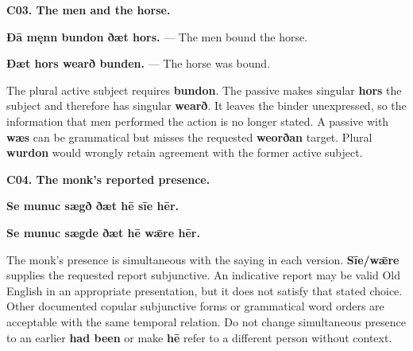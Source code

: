 \par\begin{minipage}{\linewidth}\raggedright
\textbf{C03. The men and the horse.}

\textbf{Ðā męnn bundon ðæt hors.} — The men bound the horse.

\textbf{Ðæt hors wearð bunden.} — The horse was bound.

The plural active subject requires \textbf{bundon}. The passive makes singular \textbf{hors} the subject and therefore has singular \textbf{wearð}. It leaves the binder unexpressed, so the information that men performed the action is no longer stated. A passive with \textbf{wæs} can be grammatical but misses the requested \textbf{weorðan} target. Plural \textbf{wurdon} would wrongly retain agreement with the former active subject.

\end{minipage}\par\addvspace{4pt}

\par\begin{minipage}{\linewidth}\raggedright
\textbf{C04. The monk's reported presence.}

\textbf{Se munuc sægð ðæt hē sīe hēr.}

\textbf{Se munuc sægde ðæt hē wǣre hēr.}

The monk's presence is simultaneous with the saying in each version. \textbf{Sīe/\allowbreak{}wǣre} supplies the requested report subjunctive. An indicative report may be valid Old English in an appropriate presentation, but it does not satisfy that stated choice. Other documented copular subjunctive forms or grammatical word orders are acceptable with the same temporal relation. Do not change simultaneous presence to an earlier \textbf{had been} or make \textbf{hē} refer to a different person without context.

\end{minipage}\par\addvspace{4pt}

